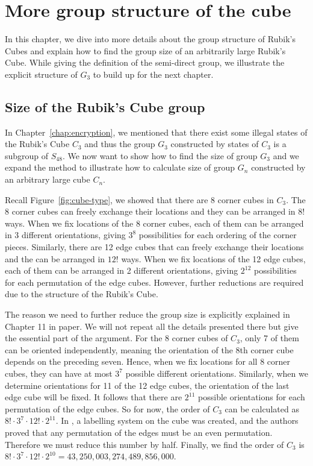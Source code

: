 \chapter{More group structure of the cube}\label{chap:structure}
In this chapter, we dive into more details about the group structure of Rubik's Cubes and explain how to find the group size of an arbitrarily large Rubik's Cube. While giving the definition of the semi-direct group, we illustrate the explicit structure of $G_3$ to build up for the next chapter.

\section{Size of the Rubik's Cube group}
\par In Chapter~\ref{chap:encryption}, we mentioned that there exist some illegal states of the Rubik's Cube $C_3$ and thus the group $G_3$ constructed by states of $C_3$ is a subgroup of $S_{48}$. We now want to show how to find the size of group $G_3$ and we expand the method to illustrate how to calculate size of group $G_n$ constructed by an arbitrary large cube $C_n$.
\par Recall Figure~\ref{fig:cube-type}, we showed that there are 8 corner cubes in $C_3$. The 8 corner cubes can freely exchange their locations and they can be arranged in $8!$ ways. When we fix locations of the 8 corner cubes, each of them can be arranged in 3 different orientations, giving $3^8$ possibilities for each ordering of the corner pieces. Similarly, there are 12 edge cubes that can freely exchange their locations and the can be arranged in $12!$ ways. When we fix locations of the 12 edge cubes, each of them can be arranged in 2 different orientations, giving $2^{12}$ possibilities for each permutation of the edge cubes. However, further reductions are required due to the structure of the Rubik's Cube.
\par The reason we need to further reduce the group size is explicitly explained in Chapter 11 in paper\cite{janet}. We will not repeat all the details presented there but give the essential part of the argument. For the 8 corner cubes of $C_3$, only 7 of them can be oriented independently, meaning the orientation of the 8th corner cube depends on the preceding seven. Hence, when we fix locations for all 8 corner cubes, they can have at most $3^7$ possible different orientations. Similarly, when we determine orientations for 11 of the 12 edge cubes, the orientation of the last edge cube will be fixed. It follows that there are $2^{11}$ possible orientations for each permutation of the edge cubes. So for now, the order of $C_3$ can be calculated as $8! \cdot 3^7 \cdot 12! \cdot 2^{11}$. In \cite{janet}, a labelling system on the cube was created, and the authors proved that any permutation of the edges must be an even permutation. Therefore we must reduce this number by half. Finally, we find the order of $C_3$ is $8! \cdot 3^7 \cdot 12! \cdot 2^{10} = 43,250,003,274,489,856,000$.
